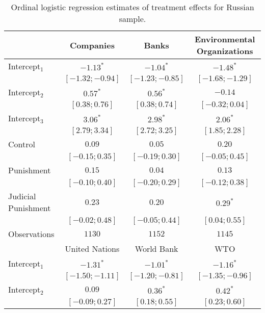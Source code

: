 \begin{table}[h]
\begin{center}
\caption{Ordinal logistic regression estimates of treatment effects for Russian sample.}
\begin{threeparttable}
\begin{tabular}{l c c c}
\hline
 & Companies & Banks & Environmental
Organizations \\
\hline
Intercept$_1$       & $-1.13^{*}$       & $-1.04^{*}$       & $-1.48^{*}$       \\
                    & $ [-1.32; -0.94]$ & $ [-1.23; -0.85]$ & $ [-1.68; -1.29]$ \\
Intercept$_2$       & $0.57^{*}$        & $0.56^{*}$        & $-0.14$           \\
                    & $ [ 0.38;  0.76]$ & $ [ 0.38;  0.74]$ & $ [-0.32;  0.04]$ \\
Intercept$_3$       & $3.06^{*}$        & $2.98^{*}$        & $2.06^{*}$        \\
                    & $ [ 2.79;  3.34]$ & $ [ 2.72;  3.25]$ & $ [ 1.85;  2.28]$ \\
Control             & $0.09$            & $0.05$            & $0.20$            \\
                    & $ [-0.15;  0.35]$ & $ [-0.19;  0.30]$ & $ [-0.05;  0.45]$ \\
Punishment          & $0.15$            & $0.04$            & $0.13$            \\
                    & $ [-0.10;  0.40]$ & $ [-0.20;  0.29]$ & $ [-0.12;  0.38]$ \\
Judicial Punishment & $0.23$            & $0.20$            & $0.29^{*}$        \\
                    & $ [-0.02;  0.48]$ & $ [-0.05;  0.44]$ & $ [ 0.04;  0.55]$ \\
\hline
Observations        & $1130$            & $1152$            & $1145$            \\
\hline
 & United Nations & World Bank & WTO \\
\hline
Intercept$_1$       & $-1.31^{*}$       & $-1.01^{*}$       & $-1.16^{*}$       \\
                    & $ [-1.50; -1.11]$ & $ [-1.20; -0.81]$ & $ [-1.35; -0.96]$ \\
Intercept$_2$       & $0.09$            & $0.36^{*}$        & $0.42^{*}$        \\
                    & $ [-0.09;  0.27]$ & $ [ 0.18;  0.55]$ & $ [ 0.23;  0.60]$ \\

\end{tabular}
\end{threeparttable}
\end{center}
\end{table}
